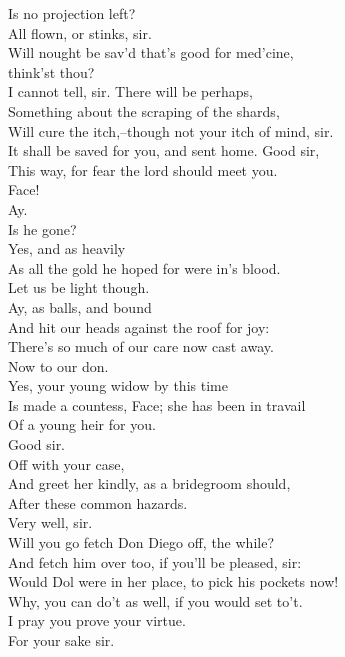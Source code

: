 \documentclass{memoir}
\begin{document}
\begin{drama*}
 Is no projection left?\\
\facespeaks {} All flown, or stinks, sir.\\
\mammonspeaks  Will nought be sav'd that's good for med'cine,\\
 think'st thou?\\
\facespeaks {} I cannot tell, sir. There will be perhaps,\\
 Something about the scraping of the shards,\\
 Will cure the itch,--though not your itch of mind, sir.\\
 It shall be saved for you, and sent home. Good sir,\\
 This way, for fear the lord should meet you.\\
\subtlespeaks {} Face!\\
\facespeaks {} Ay.\\
\subtlespeaks  Is he gone?\\
\facespeaks {} Yes, and as heavily\\
 As all the gold he hoped for were in's blood.\\
 Let us be light though.\\
\subtlespeaks {} Ay, as balls, and bound\\
 And hit our heads against the roof for joy:\\
 There's so much of our care now cast away.\\
\facespeaks  Now to our don.\\
\subtlespeaks {} Yes, your young widow by this time\\
 Is made a countess, Face; she has been in travail\\
 Of a young heir for you.\\
\facespeaks {} Good sir.\\
\subtlespeaks {} Off with your case,\\
 And greet her kindly, as a bridegroom should,\\
 After these common hazards.\\
\facespeaks {} Very well, sir.\\
 Will you go fetch Don Diego off, the while?\\
\subtlespeaks  And fetch him over too, if you'll be pleased, sir:\\
 Would Dol were in her place, to pick his pockets now!\\
\facespeaks  Why, you can do't as well, if you would set to't.\\
 I pray you prove your virtue.\\
\subtlespeaks {} For your sake sir.\\
\scene


\end{drama*}
\end{document}
